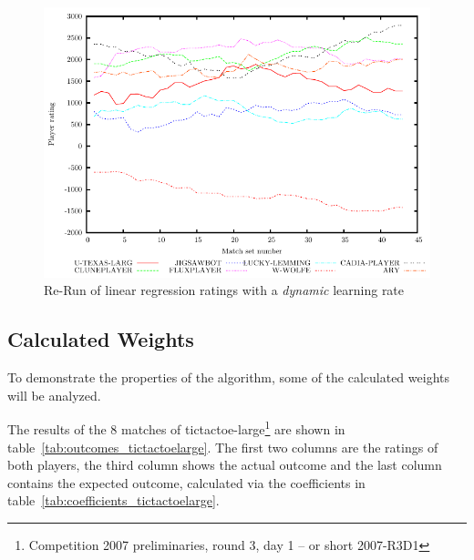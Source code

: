 \documentclass[a4paper,10pt]{article}
\begin{document}
\begin{figure}
 \centering
 \includegraphics[width=\textwidth]{dynamic_linear_regression_60_with_initial_values}
 \caption{Re-Run of linear regression ratings with a \textit{dynamic} learning rate}
 \label{fig:dynamic_linear_regression_with_initial_values}
\end{figure}

\subsection{Calculated Weights}
To demonstrate the properties of the algorithm, some of the calculated weights
will be analyzed.

The results of the 8 matches of tictactoe-large\footnote{Competition 2007
preliminaries, round 3, day 1 -- or short 2007-R3D1} are shown in
table~\ref{tab:outcomes_tictactoelarge}. The first two columns are the ratings
of both players, the third column shows the actual outcome and the last column
contains the expected outcome, calculated via the coefficients in
table~\ref{tab:coefficients_tictactoelarge}.
\end{document}
